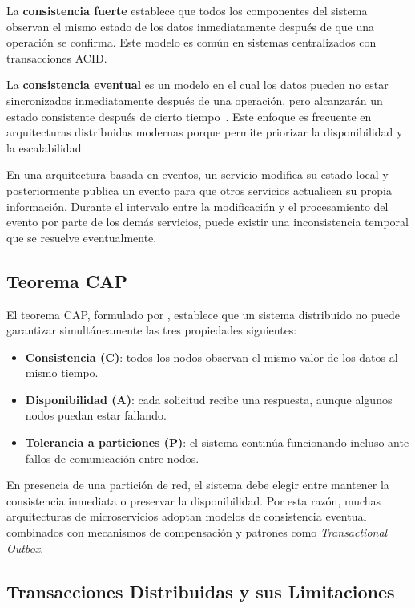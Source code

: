 La \textbf{consistencia fuerte} establece que todos los componentes del sistema observan el mismo estado de los datos inmediatamente después de que una operación se confirma. Este modelo es común en sistemas centralizados con transacciones ACID.

La \textbf{consistencia eventual} es un modelo en el cual los datos pueden no estar sincronizados inmediatamente después de una operación, pero alcanzarán un estado consistente después de cierto tiempo~\parencite{vogels2009}. Este enfoque es frecuente en arquitecturas distribuidas modernas porque permite priorizar la disponibilidad y la escalabilidad.

En una arquitectura basada en eventos, un servicio modifica su estado local y posteriormente publica un evento para que otros servicios actualicen su propia información. Durante el intervalo entre la modificación y el procesamiento del evento por parte de los demás servicios, puede existir una inconsistencia temporal que se resuelve eventualmente.

\subsection{Teorema CAP}

El teorema CAP, formulado por \textcite{brewer2012}, establece que un sistema distribuido no puede garantizar simultáneamente las tres propiedades siguientes:

\begin{itemize}
    \item \textbf{Consistencia (C)}: todos los nodos observan el mismo valor de los datos al mismo tiempo.
    \item \textbf{Disponibilidad (A)}: cada solicitud recibe una respuesta, aunque algunos nodos puedan estar fallando.
    \item \textbf{Tolerancia a particiones (P)}: el sistema continúa funcionando incluso ante fallos de comunicación entre nodos.
\end{itemize}

En presencia de una partición de red, el sistema debe elegir entre mantener la consistencia inmediata o preservar la disponibilidad. Por esta razón, muchas arquitecturas de microservicios adoptan modelos de consistencia eventual combinados con mecanismos de compensación y patrones como \textit{Transactional Outbox}.

\subsection{Transacciones Distribuidas y sus Limitaciones}

